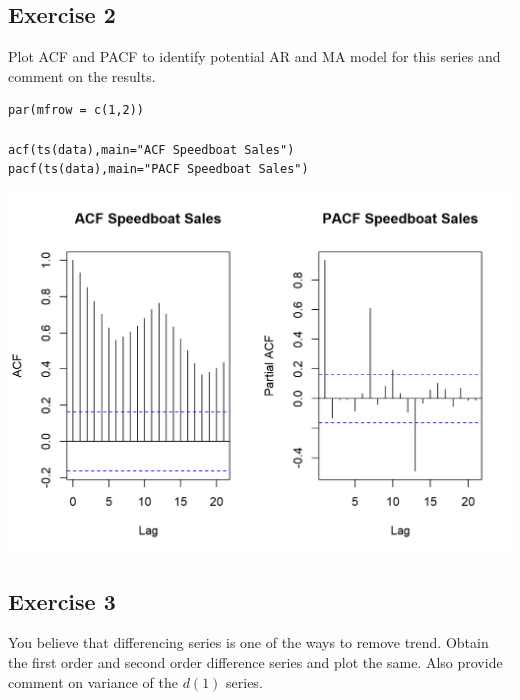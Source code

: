 \documentclass[a4paper,12pt]{article}
\begin{document}
\newpage 

\subsection*{Exercise 2}
\noindent Plot ACF and PACF to identify potential AR and MA model for this series and
comment on the results.
\begin{framed}
\begin{verbatim}
par(mfrow = c(1,2))

acf(ts(data),main="ACF Speedboat Sales")
pacf(ts(data),main="PACF Speedboat Sales")
\end{verbatim}
\end{framed}

\includegraphics[]{00-B2/images/Speedboat_2.png}


\newpage 

\subsection*{Exercise 3}

\noindent You believe that differencing series is one of the ways to remove trend. Obtain the first
order and second order difference series and plot the same. Also provide comment on
variance of the $d(1)$ series.
\end{document}
